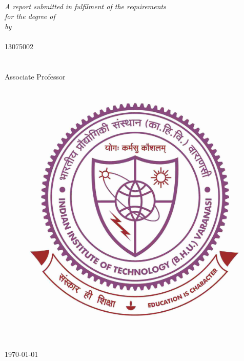 \documentclass[11pt, a4paper, oneside]{Thesis} %
\theoremstyle{definition}
\begin{document}
\begin{titlepage}
\begin{center}

\HRule \\[0.4cm] %
{\huge \bfseries \ttitle}\\[0.4cm] %
\HRule \\[1.5cm] %
 
\large \textit{A report submitted in fulfilment of the requirements\\ for the degree of \degreename}\\[0.3cm] %
\textit{by}\\
\authornames\\
13075002\\
\deptname\\[0.2cm]
\supname\\
Associate Professor\\
\deptname\\[0.4cm]


\vfill
\graphicspath{ {./Figures/} }
\begin{figure}[hb]
  \centering
  \includegraphics[width=0.4\linewidth]{Pictures/bhulogo}
\end{figure}

\DEPTNAME\\ %
\textsc{ \UNIVNAME}\\[1.5cm] %
\large \today\\[2cm] %


\end{center}

\end{titlepage}

\end{document}

